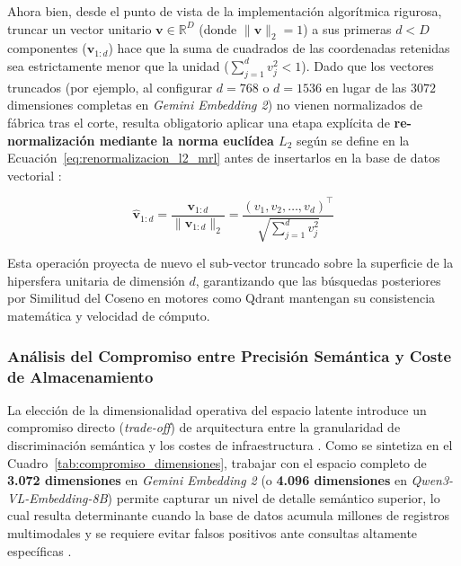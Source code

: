 Ahora bien, desde el punto de vista de la implementación algorítmica rigurosa, truncar un vector unitario $\mathbf{v} \in \mathbb{R}^{D}$ (donde $\|\mathbf{v}\|_2 = 1$) a sus primeras $d < D$ componentes ($\mathbf{v}_{1:d}$) hace que la suma de cuadrados de las coordenadas retenidas sea estrictamente menor que la unidad ($\sum_{j=1}^{d} v_j^2 < 1$). Dado que los vectores truncados (por ejemplo, al configurar $d = 768$ o $d = 1536$ en lugar de las $3072$ dimensiones completas en \textit{Gemini Embedding 2}) no vienen normalizados de fábrica tras el corte, resulta obligatorio aplicar una etapa explícita de \textbf{re-normalización mediante la norma euclídea $L_2$} según se define en la Ecuación~\eqref{eq:renormalizacion_l2_mrl} antes de insertarlos en la base de datos vectorial \cite{gemini_emb2_docs}:

\begin{equation}
\hat{\mathbf{v}}_{1:d} = \frac{\mathbf{v}_{1:d}}{\|\mathbf{v}_{1:d}\|_2} = \frac{(v_1, v_2, \dots, v_d)^\top}{\sqrt{\sum_{j=1}^{d} v_j^2}}
\label{eq:renormalizacion_l2_mrl}
\end{equation}

Esta operación proyecta de nuevo el sub-vector truncado sobre la superficie de la hipersfera unitaria de dimensión $d$, garantizando que las búsquedas posteriores por Similitud del Coseno en motores como Qdrant mantengan su consistencia matemática y velocidad de cómputo.

\subsubsection{Análisis del Compromiso entre Precisión Semántica y Coste de Almacenamiento}
\label{subsubsec:compromiso_precision_almacenamiento}

La elección de la dimensionalidad operativa del espacio latente introduce un compromiso directo (\textit{trade-off}) de arquitectura entre la granularidad de discriminación semántica y los costes de infraestructura \cite{gemini_emb2_docs, qwen3_vl_emb2026}. Como se sintetiza en el Cuadro~\ref{tab:compromiso_dimensiones}, trabajar con el espacio completo de \textbf{3.072 dimensiones} en \textit{Gemini Embedding 2} (o \textbf{4.096 dimensiones} en \textit{Qwen3-VL-Embedding-8B}) permite capturar un nivel de detalle semántico superior, lo cual resulta determinante cuando la base de datos acumula millones de registros multimodales y se requiere evitar falsos positivos ante consultas altamente específicas \cite{gemini_emb2_docs, qwen3_vl_emb2026}.

